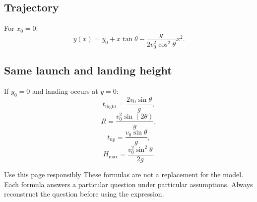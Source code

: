 \documentclass[11pt,a4paper]{article}
\begin{document}
\subsection*{Trajectory}
For $x_0=0$:
\[
y(x)=y_0+x\tan\theta-\frac{g}{2v_0^2\cos^2\theta}x^2.
\]

\subsection*{Same launch and landing height}
If $y_0=0$ and landing occurs at $y=0$:
\[
t_{\mathrm{flight}}=\frac{2v_0\sin\theta}{g},
\]
\[
R=\frac{v_0^2\sin(2\theta)}{g},
\]
\[
t_{\mathrm{up}}=\frac{v_0\sin\theta}{g},
\]
\[
H_{\max}=\frac{v_0^2\sin^2\theta}{2g}.
\]

\begin{warningbox}{Use this page responsibly}
These formulas are not a replacement for the model. Each formula answers a particular question under particular assumptions. Always reconstruct the question before using the expression.
\end{warningbox}
\end{document}
